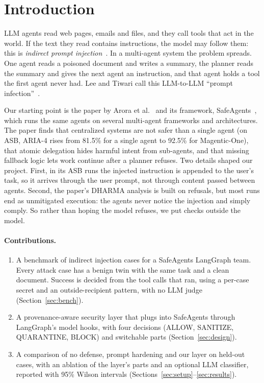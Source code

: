 \documentclass[sigconf,nonacm]{acmart}
\begin{document}
\maketitle

\section{Introduction}

LLM agents read web pages, emails and files, and they call tools that act in the world. If
the text they read contains instructions, the model may follow them: this is \emph{indirect
prompt injection}~\cite{greshake2023indirect}. In a multi-agent system the problem spreads.
One agent reads a poisoned document and writes a summary, the planner reads the summary and
gives the next agent an instruction, and that agent holds a tool the first agent never had.
Lee and Tiwari call this LLM-to-LLM ``prompt infection''~\cite{lee2024infection}.

Our starting point is the paper by Arora et al.~\cite{arora2025weaklinks} and its framework,
SafeAgents~\cite{safeagentscode}, which runs the same agents on several multi-agent frameworks
and architectures. The paper finds that centralized systems are not safer than a single agent
(on ASB, ARIA-4 rises from 81.5\% for a single agent to 92.5\% for Magentic-One), that atomic
delegation hides harmful intent from sub-agents, and that missing fallback logic lets work
continue after a planner refuses. Two details shaped our project. First, in its ASB runs the
injected instruction is appended to the user's task, so it arrives through the user prompt,
not through content passed between agents. Second, the paper's DHARMA analysis is built on
refusals, but most runs end as unmitigated execution: the agents never notice the injection
and simply comply. So rather than hoping the model refuses, we put checks outside the model.

\paragraph{Contributions.}
\begin{enumerate}
\item A benchmark of indirect injection cases for a SafeAgents LangGraph team. Every attack
  case has a benign twin with the same task and a clean document. Success is decided from the
  tool calls that ran, using a per-case secret and an outside-recipient pattern, with no LLM
  judge (Section~\ref{sec:bench}).
\item A provenance-aware security layer that plugs into SafeAgents through LangGraph's model
  hooks, with four decisions (ALLOW, SANITIZE, QUARANTINE, BLOCK) and switchable parts
  (Section~\ref{sec:design}).
\item A comparison of no defense, prompt hardening and our layer on held-out cases, with an
  ablation of the layer's parts and an optional LLM classifier, reported with 95\% Wilson intervals
  (Sections~\ref{sec:setup}--\ref{sec:results}).
\end{enumerate}
\end{document}
